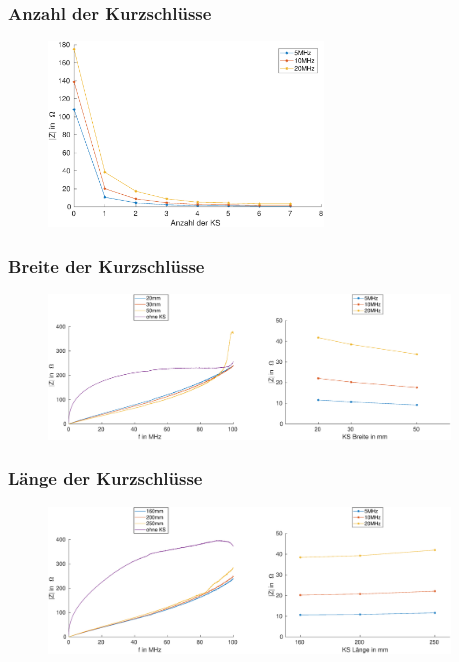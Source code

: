 \documentclass[accentcolor=tud9b, colorbacktitle, inverttitle]{tudbeamer}
\begin{document}
\begin{frame}\frametitle{Anzahl der Kurzschl\"usse}
 \vspace{-1em}
\begin{figure}[h]
	\centering
	\includegraphics[width=0.65\textwidth]{RK_Impedanz_numberKS_frequenz}
\end{figure}
\end{frame}



\begin{frame}\frametitle{Breite der Kurzschlüsse}
\vspace{-1em}
\begin{figure}[h]
	\centering
	\includegraphics[width=0.95\textwidth]{Z_ges_width_frequency_SimMeas}
\end{figure}
\end{frame}



\begin{frame}\frametitle{Länge der Kurzschlüsse}
\vspace{-1em}
\begin{figure}[h]
	\centering
	\includegraphics[width=0.95\textwidth]{Z_ges_length_frequency_SimMeas}
\end{figure}
\end{frame}
\end{document}
